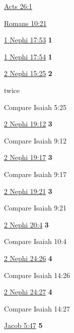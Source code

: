 \begin{multicols}{3}
\begin{compactitem}
				\item[{\hyperref[ACTS-26-1]{Acts 26:1}}]
				\item[{\hyperref[ROMANS-10-21]{Romans 10:21}}]
				\item[{\hyperref[1NEPHI-17-53]{1 Nephi 17:53}}] \textbf{1}
				\item[{\hyperref[1NEPHI-17-54]{1 Nephi 17:54}}] \textbf{1}
				\item[{\hyperref[2NEPHI-15-25]{2 Nephi 15:25}}] \textbf{2}
					\begin{compactitem}
						\item twice
						\item Compare Isaiah 5:25
					\end{compactitem}
				\item[{\hyperref[2NEPHI-19-12]{2 Nephi 19:12}}] \textbf{3}
					\begin{compactitem}
						\item Compare Isaiah 9:12 
					\end{compactitem} 
				\item[{\hyperref[2NEPHI-19-17]{2 Nephi 19:17}}] \textbf{3}
					\begin{compactitem}
						\item Compare Isaiah 9:17
					\end{compactitem}
				\item[{\hyperref[2NEPHI-19-21]{2 Nephi 19:21}}] \textbf{3}
					\begin{compactitem}
						\item Compare Isaiah 9:21
					\end{compactitem}
				\item[{\hyperref[2NEPHI-20-4]{2 Nephi 20:4}}] \textbf{3}
					\begin{compactitem}
						\item Compare Isaiah 10:4
					\end{compactitem}
				\item[{\hyperref[2NEPHI-24-26]{2 Nephi 24:26}}] \textbf{4}
					\begin{compactitem}
						\item Compare Isaiah 14:26
					\end{compactitem}
				\item[{\hyperref[2NEPHI-24-27]{2 Nephi 24:27}}] \textbf{4}
					\begin{compactitem}
						\item Compare Isaiah 14:27
					\end{compactitem} 
				\item[{\hyperref[JACOB-5-47]{Jacob 5:47}}] \textbf{5}

\end{compactitem}
\end{multicols}
